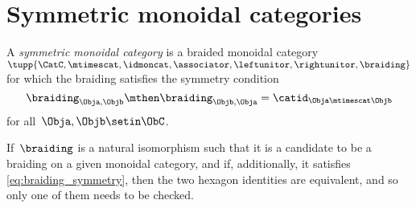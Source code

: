 \section{Symmetric monoidal categories}

\begin{ctdefinition}
    \label{def:sym-mon-cat}
    A \emph{symmetric monoidal category} is a braided monoidal category~$\tupp{\CatC,\mtimescat, \idmoncat, \associator, \leftunitor, \rightunitor, \braiding}$ for which the braiding satisfies the symmetry condition
    \begin{equation}
        \label{eq:braiding-symmetry}
        \braiding_{\Obja,\Objb} \mthen \braiding_{\Objb,\Obja} = \catid_{\Obja \mtimescat \Objb}
    \end{equation}
    for all~$\Obja, \Objb \setin \ObC$.
\end{ctdefinition}

\begin{remark}
    If~$\braiding$ is a natural isomorphism such that it is a candidate to be a braiding on a given monoidal category, and if, additionally, it satisfies \cref{eq:braiding_symmetry}, then the two hexagon identities are equivalent, and so only one of them needs to be checked.
\end{remark}
